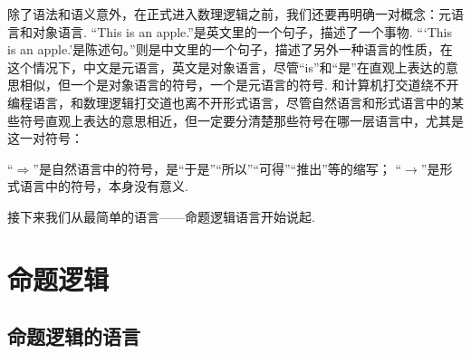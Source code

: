 \documentclass[main.tex]{subfiles}
\begin{document}
\vspace{1cm}

除了语法和语义意外，在正式进入数理逻辑之前，我们还要再明确一对概念：元语言和对象语言. “This is an apple.”是英文里的一个句子，描述了一个事物. “‘This is an apple.’是陈述句。”则是中文里的一个句子，描述了另外一种语言的性质，在这个情况下，中文是元语言，英文是对象语言，尽管“is”和“是”在直观上表达的意思相似，但一个是对象语言的符号，一个是元语言的符号. 和计算机打交道绕不开编程语言，和数理逻辑打交道也离不开形式语言，尽管自然语言和形式语言中的某些符号直观上表达的意思相近，但一定要分清楚那些符号在哪一层语言中，尤其是这一对符号：
\begin{reference}
    “\(\Rightarrow\)”是自然语言中的符号，是“于是”“所以”“可得”“推出”等的缩写；\newline
    “\(\rightarrow\)”是形式语言中的符号，本身没有意义.
\end{reference}

接下来我们从最简单的语言——命题逻辑语言开始说起.



\section{命题逻辑}

\subsection{命题逻辑的语言}
\end{document}

